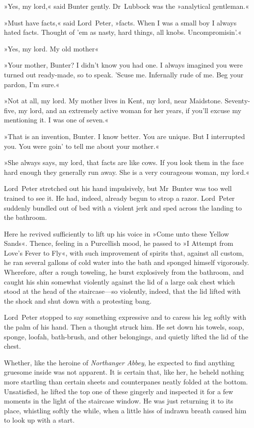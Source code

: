 »Yes, my lord,« said Bunter gently. Dr~Lubbock was the »analytical gentleman.«

»Must have facts,« said Lord~Peter, »facts. When I was a small boy I always hated facts. Thought of 'em as nasty, hard things, all knobs.  Uncompromisin'.«

»Yes, my lord. My old mother\longdash«

»Your mother, Bunter? I didn't know you had one. I always imagined you were turned out ready-made, so to speak. 'Scuse me. Infernally rude of me. Beg your pardon, I'm sure.«

»Not at all, my lord. My mother lives in Kent, my lord, near Maidstone.  Seventy-five, my lord, and an extremely active woman for her years, if you'll excuse my mentioning it. I was one of seven.«

»That is an invention, Bunter. I know better. You are unique. But I interrupted you. You were goin' to tell me about your mother.«

»She always says, my lord, that facts are like cows. If you look them in the face hard enough they generally run away. She is a very courageous woman, my lord.«

Lord~Peter stretched out his hand impulsively, but Mr~Bunter was too well trained to see it. He had, indeed, already begun to strop a razor.  Lord~Peter suddenly bundled out of bed with a violent jerk and sped
across the landing to the bathroom.

Here he revived sufficiently to lift up his voice in »Come unto these Yellow Sands«. Thence, feeling in a Purcellish mood, he passed to »I Attempt from Love's Fever to Fly«, with such improvement of spirits that, against all custom, he ran several gallons of cold water into the bath and sponged himself vigorously. Wherefore, after a rough toweling, he burst explosively from the bathroom, and caught his shin somewhat violently against the lid of a large oak chest which stood at the head of the staircase—so violently, indeed, that the lid lifted with the shock and shut down with a protesting bang.

Lord~Peter stopped to say something expressive and to caress his leg softly with the palm of his hand. Then a thought struck him. He set down his towels, soap, sponge, loofah, bath-brush, and other belongings, and quietly lifted the lid of the chest.

Whether, like the heroine of \textit{Northanger Abbey}, he expected to find anything gruesome inside was not apparent. It is certain that, like her, he beheld nothing more startling than certain sheets and counterpanes neatly folded at the bottom. Unsatisfied, he lifted the top one of these gingerly and inspected it for a few moments in the light of the staircase window. He was just returning it to its place, whistling softly the while, when a little hiss of indrawn breath caused him to look up with a start.

